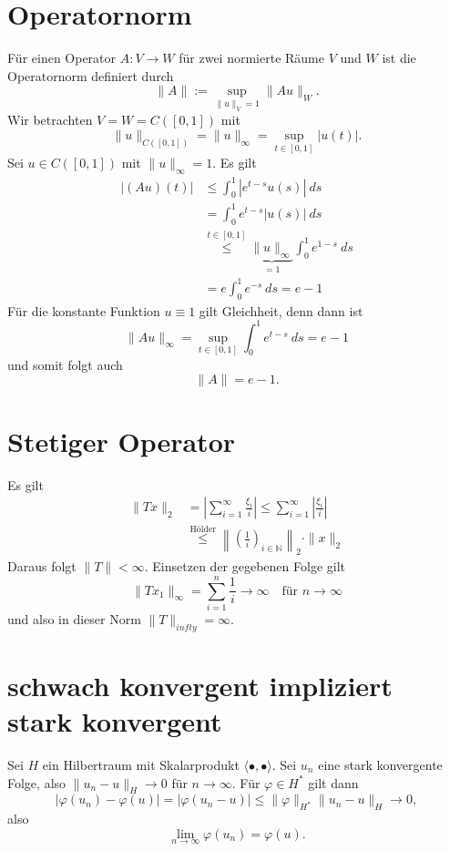 \documentclass{article}
\begin{document}
\section{Operatornorm}
Für einen Operator $A \colon V \to W$ für zwei normierte Räume $V$ und $W$ ist die Operatornorm definiert durch
$$\| A \|:= \sup_{\| u \|_V = 1} \| A u \|_W.$$
Wir betrachten $V = W = C([0,1])$ mit
$$\|u \|_{C([0,1])} = \| u \|_\infty = \sup_{t\in [0,1]} |u(t)|.$$
Sei $u \in C([0,1])$ mit $\| u \|_\infty = 1$. Es gilt
\begin{align*}
    |\left(Au\right)(t)| & \le \int_0^1 |e^{t-s} u(s) |~ds\\
    &= \int_0^1 e^{t-s} |u(s)| ~ds \\
    &\stackrel{t\in [0,1]}\le \underbrace{\|u\|_\infty}_{=1} \int_0^1 e^{1-s}~ds \\
    &= e\int_0^1 e^{-s}~ds = e-1 
\end{align*}
Für die konstante Funktion $u \equiv 1$ gilt Gleichheit, denn dann ist
$$\| Au \|_\infty = \sup_{t\in [0,1]} \int_0^1 e^{t-s}~ds = e-1$$
und somit folgt auch
$$\| A \| = e-1.$$

\section{Stetiger Operator}
Es gilt
\begin{align*}\| Tx \|_2 &= \left| \sum_{i=1}^\infty \frac{ξ_i}{i} \right| \le \sum_{i=1}^\infty \left| \frac{ξ_i}{i}\right| \\
&\stackrel{\text{Hölder}}\le \left\| \left( \frac{1}{i} \right)_{i\in ℕ} \right\|_2 \cdot \|x \|_2
\end{align*}
Daraus folgt $\| T \|<\infty$.
Einsetzen der gegebenen Folge gilt
$$\|Tx_1 \|_\infty = \sum_{i=1}^n \frac{1}{i}\to \infty\quad \text{für $n\to \infty$}$$
und also in dieser Norm $\| T \|_{infty} = \infty$.

\setcounter{section}{2}
\section{schwach konvergent impliziert stark konvergent}
Sei $H$ ein Hilbertraum mit Skalarprodukt $\langle •,•\rangle$. Sei $u_n$ eine stark konvergente Folge, also $\|u_n - u\|_H \to 0$ für $n\to \infty$. Für $φ\in H^*$ gilt dann
$$|φ(u_n) - φ(u) | = |φ(u_n - u)| \le \| φ \|_{H^*} \|u_n - u \|_H \to 0,$$
also 
$$\lim_{n\to \infty} φ(u_n) = φ(u).$$
\end{document}
